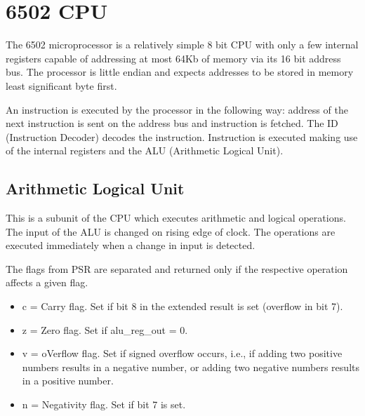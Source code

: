 \documentclass[letterpaper,10pt,english]{sphinxmanual}
\begin{document}
\sphinxstepscope


\section{6502 CPU}
\label{\detokenize{core_6502:cpu}}\label{\detokenize{core_6502::doc}}
\sphinxAtStartPar
The 6502 microprocessor is a relatively simple 8 bit CPU with only a few
internal registers capable of addressing at most 64Kb of memory via its 16 bit
address bus. The processor is little endian and expects addresses to be stored
in memory least significant byte first.

\sphinxAtStartPar
An instruction is executed by the processor in the following way: address of the
next instruction is sent on the address bus and instruction is fetched. The ID
(Instruction Decoder) decodes the instruction. Instruction is executed making
use of the internal registers and the ALU (Arithmetic Logical Unit).

\sphinxstepscope


\subsection{Arithmetic Logical Unit}
\label{\detokenize{alu_6502:arithmetic-logical-unit}}\label{\detokenize{alu_6502::doc}}
\sphinxAtStartPar
This is a subunit of the CPU which executes arithmetic and logical operations.
The input of the ALU is changed on rising edge of clock. The operations are
executed immediately when a change in input is detected.

\sphinxAtStartPar
The flags from PSR are separated and returned only if the respective operation
affects a given flag.
\begin{itemize}
\item {} 
\sphinxAtStartPar
c = Carry flag. Set if bit 8 in the extended result is set (overflow in bit 7).

\item {} 
\sphinxAtStartPar
z = Zero flag. Set if alu\_reg\_out = 0.

\item {} 
\sphinxAtStartPar
v = oVerflow flag. Set if signed overflow occurs, i.e., if adding two positive
numbers results in a negative number, or adding two negative numbers results
in a positive number.

\item {} 
\sphinxAtStartPar
n = Negativity flag. Set if bit 7 is set.

\end{itemize}
\end{document}
